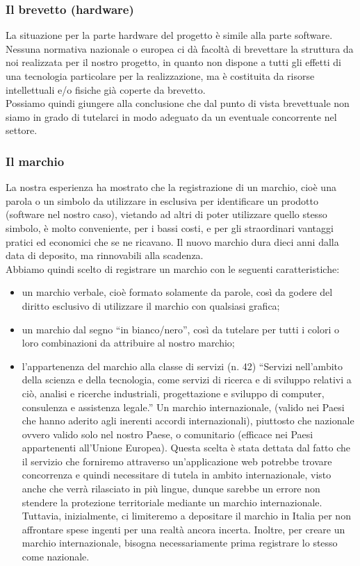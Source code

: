 \subsubsection{Il brevetto (hardware)}
La situazione per la parte hardware del progetto è simile alla parte software.\\
Nessuna normativa nazionale o europea ci dà facoltà di brevettare la struttura da noi realizzata per il nostro progetto, in quanto non dispone a tutti gli effetti di una tecnologia particolare per la realizzazione, ma è costituita da risorse intellettuali e/o fisiche già coperte da brevetto.\\
Possiamo quindi giungere alla conclusione che dal punto di vista brevettuale non siamo in grado di tutelarci in modo adeguato da un eventuale concorrente nel settore.

\subsubsection{Il marchio}
La nostra esperienza ha mostrato che la registrazione di un marchio, cioè una parola o un simbolo da utilizzare in esclusiva per identificare un prodotto (software nel nostro caso), vietando ad altri di poter utilizzare quello stesso simbolo, è molto conveniente, per i bassi costi, e per gli straordinari vantaggi pratici ed economici che se ne ricavano. Il nuovo marchio dura dieci anni dalla data di deposito, ma rinnovabili alla scadenza. \\
Abbiamo quindi scelto di registrare un marchio con le seguenti caratteristiche:
\begin{itemize}
\item un marchio verbale, cioè formato solamente da parole, così da godere del diritto esclusivo di utilizzare il marchio con qualsiasi grafica;
\item un marchio dal segno ``in bianco/nero'', così da tutelare per tutti i colori o loro combinazioni da attribuire al nostro marchio;
\item l'appartenenza del marchio alla classe di servizi (n. 42) ``Servizi nell'ambito della scienza e della tecnologia, come servizi di ricerca e di sviluppo relativi a ciò, analisi e ricerche industriali, progettazione e sviluppo di computer, consulenza e assistenza legale.'' Un marchio internazionale, (valido nei Paesi che hanno aderito agli inerenti accordi internazionali), piuttosto che nazionale ovvero valido solo nel nostro Paese, o  comunitario (efficace nei Paesi appartenenti all'Unione Europea). Questa scelta è stata dettata dal fatto che il servizio che forniremo attraverso un'applicazione web potrebbe trovare concorrenza e quindi necessitare di tutela in ambito internazionale, visto anche che verrà rilasciato in più lingue, dunque sarebbe un errore non stendere la protezione territoriale mediante un marchio internazionale. Tuttavia, inizialmente, ci limiteremo a depositare il marchio in Italia per non affrontare spese ingenti per una realtà ancora incerta. Inoltre, per creare un marchio internazionale, bisogna necessariamente prima registrare lo stesso come nazionale.
\end{itemize}

